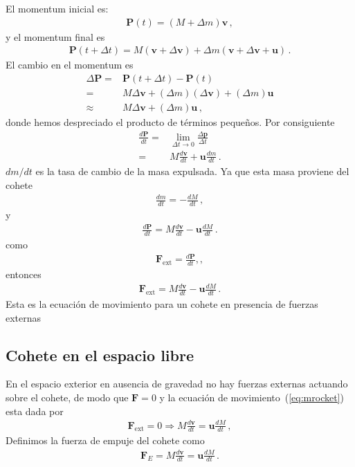 El momentum inicial es:
\begin{align}
  \mathbf{P}(t)=(M+\Delta m)\mathbf{v}\,,
\end{align}
y el momentum final es
\begin{align}
  \mathbf{P}(t+\Delta t)=M(\mathbf{v}+\Delta\mathbf{v})+\Delta m(\mathbf{v}+\Delta\mathbf{v}+\mathbf{u})\,.
\end{align}
El cambio en el momentum es
\begin{align}
  \Delta\mathbf{P}=&\mathbf{P}(t+\Delta t)-\mathbf{P}(t)\nonumber\\
=&M\Delta\mathbf{v}+(\Delta m)(\Delta\mathbf{v})+(\Delta m)\mathbf{u}\nonumber\\
\approx &M\Delta\mathbf{v}+(\Delta m)\mathbf{u}\,,
\end{align}
donde hemos despreciado el producto de términos pequeños. Por consiguiente
\begin{align}
  \frac{d\mathbf{P}}{dt}=&\lim_{\Delta t\to 0}\frac{\Delta\mathbf{p}}{\Delta t}\nonumber\\
=&M\frac{d\mathbf{v}}{dt}+\mathbf{u}\frac{dm}{dt}\,.
\end{align}
$dm/dt$ es la tasa de cambio de la masa expulsada. Ya que esta masa proviene del cohete
\begin{align}
  \frac{dm}{dt}=-\frac{dM}{dt}\,,
\end{align}
y
\begin{align}
  \frac{d\mathbf{P}}{dt}=M\frac{d\mathbf{v}}{dt}-\mathbf{u}\frac{dM}{dt}\,.
\end{align}
como
\begin{align}
  \mathbf{F}_{\text{ext}}=\frac{d\mathbf{P}}{dt},,
\end{align}
entonces
\begin{align}
  \label{eq:mrocket}
   \mathbf{F}_{\text{ext}}=M\frac{d\mathbf{v}}{dt}-\mathbf{u}\frac{dM}{dt}\,.
\end{align}
Esta es la ecuación de movimiento para un cohete en presencia de
fuerzas externas

\subsection{Cohete en el espacio libre}

En el espacio exterior en ausencia de gravedad no hay fuerzas externas actuando sobre el cohete, de modo que $\mathbf{F}=0$ y la ecuación de movimiento~(\ref{eq:mrocket}) esta dada por
\begin{align}
\label{eq:m40}
  \mathbf{F}_{\text{ext}}=0\Longrightarrow M\frac{d\mathbf{v}}{dt}=\mathbf{u}\frac{dM}{dt}\,,
\end{align}
Definimos la fuerza de empuje del cohete como
\begin{align}
  \label{eq:m39}
  \mathbf{F}_E=M\frac{d\mathbf{v}}{dt}=\mathbf{u}\frac{dM}{dt}\,.
\end{align}

